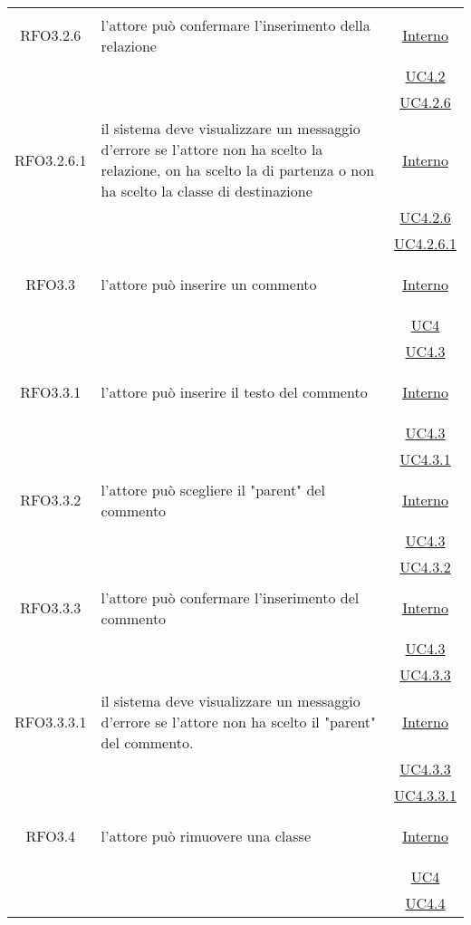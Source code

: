 \begin{longtable}{|c|>{\centering}m{7cm}|c|}
\hypertarget{RFO3.2.6}{RFO3.2.6} & l'attore può confermare l'inserimento della relazione & \hyperlink{Interno}{Interno}\\
& &\hyperref[UC4.2]{UC4.2}\\
& &\hyperref[UC4.2.6]{UC4.2.6}\\ \hline

\hypertarget{RFO3.2.6.1}{RFO3.2.6.1} & il sistema deve visualizzare un messaggio d'errore se l'attore non ha scelto la relazione, on ha scelto la di partenza o non ha scelto la classe di destinazione &  \hyperlink{Interno}{Interno}\\
& &\hyperref[UC4.2.6]{UC4.2.6}\\
& &\hyperref[UC4.2.6.1]{UC4.2.6.1}\\ \hline

\hypertarget{RFO3.3}{RFO3.3} & l'attore può inserire un commento &  \hyperlink{Interno}{Interno}\\
& &\hyperref[UC4]{UC4}\\
& &\hyperref[UC4.3]{UC4.3}\\ \hline

\hypertarget{RFO3.3.1}{RFO3.3.1} & l'attore può inserire il testo del commento & \hyperlink{Interno}{Interno}\\
& &\hyperref[UC4.3]{UC4.3}\\
& &\hyperref[UC4.3.1]{UC4.3.1}\\ \hline

\hypertarget{RFO3.3.2}{RFO3.3.2} & l'attore può scegliere il "parent" del commento & \hyperlink{Interno}{Interno}\\
& &\hyperref[UC4.3]{UC4.3}\\
& &\hyperref[UC4.3.2]{UC4.3.2}\\ \hline

\hypertarget{RFO3.3.3}{RFO3.3.3} & l’attore può confermare l'inserimento del commento & \hyperlink{Interno}{Interno}\\
& &\hyperref[UC4.3]{UC4.3}\\
& &\hyperref[UC4.3.3]{UC4.3.3}\\ \hline

\hypertarget{RFO3.3.3.1}{RFO3.3.3.1} & il sistema deve visualizzare un messaggio d’errore se l'attore non ha scelto il "parent" del commento. & \hyperlink{Interno}{Interno}\\
& &\hyperref[UC4.3.3]{UC4.3.3}\\
& &\hyperref[UC4.3.3.1]{UC4.3.3.1}\\ \hline

\hypertarget{RFO3.4}{RFO3.4} & l'attore può rimuovere una classe &  \hyperlink{Interno}{Interno}\\
& &\hyperref[UC4]{UC4}\\
& &\hyperref[UC4.4]{UC4.4}\\ \hline


\end{longtable}
